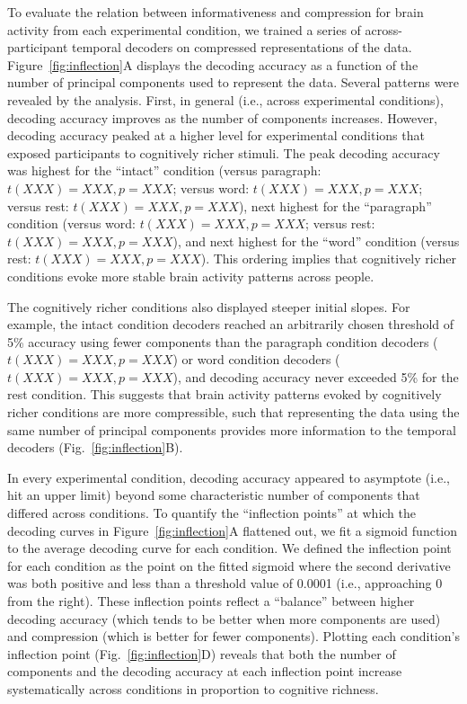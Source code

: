 \documentclass[english, 11pt]{article}
\begin{document}
To evaluate the relation between informativeness and compression for brain
activity from each experimental condition, we trained a series of
across-participant temporal decoders on compressed representations of the data.
Figure~\ref{fig:inflection}A displays the decoding accuracy as a function of
the number of principal components used to represent the data. Several patterns
were revealed by the analysis. First, in general (i.e., across experimental
conditions), decoding accuracy improves as the number of components increases.
However, decoding accuracy peaked at a higher level for experimental conditions
that exposed participants to cognitively richer stimuli. The peak decoding
accuracy was highest for the ``intact'' condition (versus paragraph: $t(XXX) =
XXX, p = XXX$; versus word: $t(XXX) = XXX, p = XXX$; versus rest: $t(XXX) =
XXX, p = XXX$), next highest for the ``paragraph'' condition (versus word:
$t(XXX) = XXX, p = XXX$; versus rest: $t(XXX) = XXX, p = XXX$), and next
highest for the ``word'' condition (versus rest: $t(XXX) = XXX, p = XXX$). 
This ordering implies that cognitively richer conditions evoke more stable brain
activity patterns across people.

The cognitively richer conditions also displayed steeper initial slopes. For
example, the intact condition decoders reached an arbitrarily chosen threshold
of 5\% accuracy using fewer components than the paragraph condition decoders
($t(XXX) = XXX, p = XXX$) or word condition decoders ($t(XXX) = XXX, p = XXX$),
and decoding accuracy never exceeded 5\% for the rest condition. This suggests
that brain activity patterns evoked by cognitively richer conditions are more
compressible, such that representing the data using the same number of
principal components provides more information to the temporal decoders
(Fig.~\ref{fig:inflection}B).

In every experimental condition, decoding accuracy appeared to asymptote (i.e.,
hit an upper limit) beyond some characteristic number of components that
differed across conditions. To quantify the ``inflection points'' at which the
decoding curves in Figure~\ref{fig:inflection}A flattened out, we fit a sigmoid
function to the average decoding curve for each condition. We defined the
inflection point for each condition as the point on the fitted sigmoid where
the second derivative was both positive and less than a threshold value of
0.0001 (i.e., approaching 0 from the right). These inflection points reflect a
``balance'' between higher decoding accuracy (which tends to be better when
more components are used) and compression (which is better for fewer
components). Plotting each condition's inflection point
(Fig.~\ref{fig:inflection}D) reveals that both the number of components and the
decoding accuracy at each inflection point increase systematically across
conditions in proportion to cognitive richness.
\end{document}

